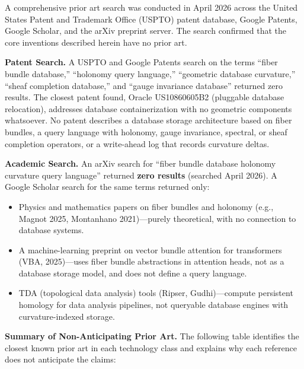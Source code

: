 \documentclass[11pt,letterpaper]{article}
\begin{document}
A comprehensive prior art search was conducted in April 2026 across the United States Patent and Trademark Office (USPTO) patent database, Google Patents, Google Scholar, and the arXiv preprint server. The search confirmed that the core inventions described herein have no prior art.

\textbf{Patent Search.} A USPTO and Google Patents search on the terms ``fiber bundle database,'' ``holonomy query language,'' ``geometric database curvature,'' ``sheaf completion database,'' and ``gauge invariance database'' returned zero results. The closest patent found, Oracle US10860605B2 (pluggable database relocation), addresses database containerization with no geometric components whatsoever. No patent describes a database storage architecture based on fiber bundles, a query language with holonomy, gauge invariance, spectral, or sheaf completion operators, or a write-ahead log that records curvature deltas.

\textbf{Academic Search.} An arXiv search for ``fiber bundle database holonomy curvature query language'' returned \textbf{zero results} (searched April 2026). A Google Scholar search for the same terms returned only:
\begin{itemize}
  \item Physics and mathematics papers on fiber bundles and holonomy (e.g., Magnot 2025, Montanhano 2021)---purely theoretical, with no connection to database systems.
  \item A machine-learning preprint on vector bundle attention for transformers (VBA, 2025)---uses fiber bundle abstractions in attention heads, not as a database storage model, and does not define a query language.
  \item TDA (topological data analysis) tools (Ripser, Gudhi)---compute persistent homology for data analysis pipelines, not queryable database engines with curvature-indexed storage.
\end{itemize}

\textbf{Summary of Non-Anticipating Prior Art.} The following table identifies the closest known prior art in each technology class and explains why each reference does not anticipate the claims:
\end{document}
